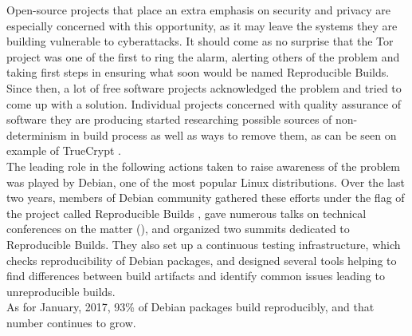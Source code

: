 {Open-source projects that place an extra emphasis on security
and privacy are especially concerned with this opportunity, as
it may leave the systems they are building vulnerable to cyberattacks.
It should come as no surprise that the Tor project was one of the
first to ring the alarm, alerting others of the problem and taking first steps
in ensuring what soon would be named Reproducible Builds\cite{tor13, tor14}.\\
Since then, a lot of free software projects acknowledged the problem and
tried to come up with a solution. Individual projects concerned with quality 
assurance of software they are producing started researching possible sources of 
non-determinism in build process as well as ways to remove them, as can be 
seen on example of TrueCrypt \cite{de2014challenges}.\\
The leading role in the following actions taken to raise awareness of the 
problem was played by Debian, one of the most popular Linux distributions.
Over the last two years, members of Debian community gathered these efforts
under the flag of the project called Reproducible Builds \cite{Rb}, 
gave numerous talks on technical conferences on the matter 
(\citep{Lun14, MiniDebConfCambridge2016, lca2017_valerie}), and organized
two summits dedicated to Reproducible Builds. They also set up a continuous 
testing infrastructure\cite{tests-rbo}, which checks reproducibility
of Debian packages, and designed several tools helping to find 
differences between build artifacts and identify common issues leading to
unreproducible builds. \\
As for January, 2017, 93\% of Debian packages
build reproducibly, and that number continues to grow.\\}
